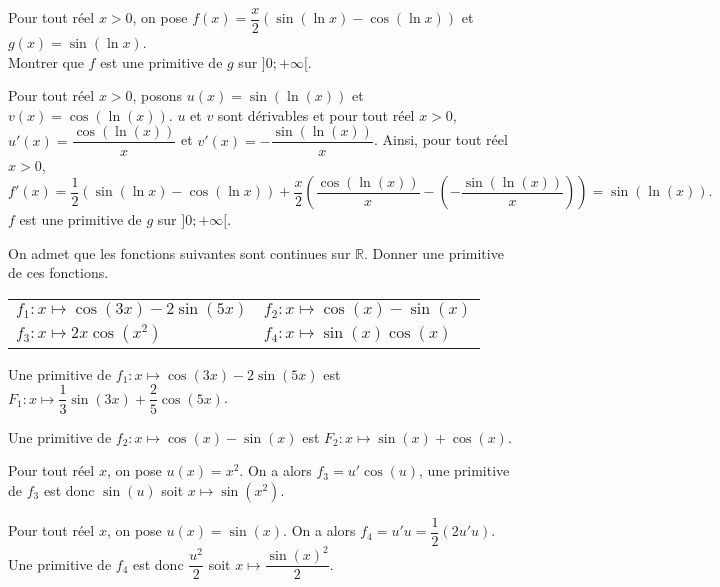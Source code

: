 \documentclass[11pt,fleqn, openany]{book} %
\begin{document}
\begin{exercise}Pour tout réel $x>0$, on pose $f(x)=\dfrac{x}{2}\left(\sin(\ln x)-\cos(\ln x)\right)$ et $g(x)=\sin(\ln x)$.\\ Montrer que $f$ est une primitive de $g$ sur $]0;+\infty[$.\end{exercise}

\begin{solution}Pour tout réel $x>0$, posons $u(x)=\sin(\ln(x))$ et $v(x)=\cos(\ln(x))$. $u$ et $v$ sont dérivables et pour tout réel $x>0$, $u'(x)=\dfrac{\cos(\ln(x))}{x}$ et $v'(x)=-\dfrac{\sin(\ln(x))}{x}$. Ainsi, pour tout réel $x>0$,
\[f'(x)=\dfrac{1}{2}(\sin(\ln x)-\cos(\ln x))+\dfrac{x}{2}\left(\dfrac{\cos(\ln(x))}{x} -\left(-\dfrac{\sin(\ln(x))}{x}\right)\right)=\sin(\ln(x)).\]
$f$ est une primitive de $g$ sur $]0;+\infty[$.

\end{solution}




\begin{exercise}On admet que les fonctions suivantes sont continues sur $\mathbb{R}$. Donner une primitive de ces fonctions.
\renewcommand{\arraystretch}{1}

\begin{tabularx}{\linewidth}{XX}
$f_1:x\mapsto \cos(3x)-2\sin(5x)$
& $f_2:x\mapsto \cos(x)-\sin(x)$ \\
 $f_3:x \mapsto 2x\cos(x^2)$
& $f_4:x \mapsto\sin(x)\cos(x)$ \\
\end{tabularx}
\end{exercise}

\begin{solution}

Une primitive de $f_1:x\mapsto \cos(3x)-2\sin(5x)$ est $F_1:x \mapsto \dfrac{1}{3}\sin(3x)+\dfrac{2}{5}\cos(5x)$.

Une primitive de $f_2:x\mapsto \cos(x)-\sin(x)$ est $F_2:x \mapsto \sin(x) + \cos(x)$.

Pour tout réel $x$, on pose $u(x)=x^2$. On a alors $f_3 = u'\cos(u)$, une primitive de $f_3$ est donc $\sin(u)$ soit $x\mapsto \sin(x^2)$.

Pour tout réel $x$, on pose $u(x)=\sin(x)$. On a alors $f_4=u'u = \dfrac{1}{2} (2u'u)$.\\ Une primitive de $f_4$ est donc $\dfrac{u^2}{2}$ soit $x\mapsto \dfrac{\sin(x)^2}{2}$.

\end{solution}
\end{document}
